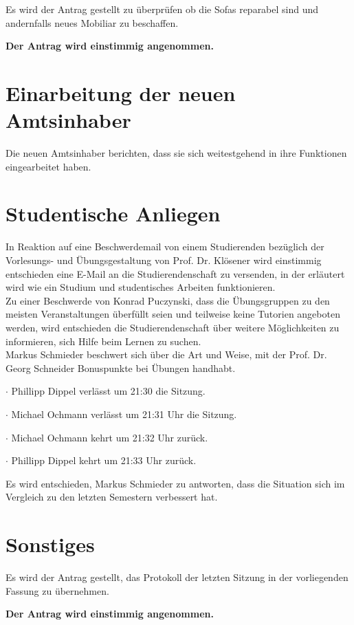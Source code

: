 \documentclass[a4paper, 11pt]{article} %
\begin{document}
Es wird der Antrag gestellt zu überprüfen ob die Sofas reparabel sind und andernfalls neues Mobiliar zu beschaffen.
\begin{center}
	\textbf{Der Antrag wird einstimmig angenommen.}
\end{center}

\section{Einarbeitung der neuen Amtsinhaber}
Die neuen Amtsinhaber berichten, dass sie sich weitestgehend in ihre Funktionen eingearbeitet haben. 

\section{Studentische Anliegen}
In Reaktion auf eine Beschwerdemail von einem Studierenden bezüglich der Vorlesungs- und Übungsgestaltung von Prof. Dr. Klösener wird einstimmig entschieden eine E-Mail an die Studierendenschaft zu versenden, in der erläutert wird wie ein Studium und studentisches Arbeiten funktionieren.
\\
Zu einer Beschwerde von Konrad Puczynski, dass die Übungsgruppen zu den meisten Veranstaltungen überfüllt seien und teilweise keine Tutorien angeboten werden, wird entschieden die Studierendenschaft über weitere Möglichkeiten zu informieren, sich Hilfe beim Lernen zu suchen.
\\
Markus Schmieder beschwert sich über die Art und Weise, mit der Prof. Dr. Georg Schneider Bonuspunkte bei Übungen handhabt.
\begin{flushleft}
\small
	$\cdotp$ Phillipp Dippel verlässt um 21:30 die Sitzung.
\end{flushleft}
\begin{flushleft}
\small
	$\cdotp$ Michael Ochmann verlässt um 21:31 Uhr die Sitzung.
\end{flushleft}
\begin{flushleft}
\small
	$\cdotp$ Michael Ochmann kehrt um 21:32 Uhr zurück.
\end{flushleft}
\begin{flushleft}
\small
	$\cdotp$ Phillipp Dippel kehrt um 21:33 Uhr zurück.
\end{flushleft}
Es wird entschieden, Markus Schmieder zu antworten, dass die Situation sich im Vergleich zu den letzten Semestern verbessert hat.

\section{Sonstiges}
Es wird der Antrag gestellt, das Protokoll der letzten Sitzung in der vorliegenden Fassung zu übernehmen.
\begin{center}
	\textbf{Der Antrag wird einstimmig angenommen.}
\end{center}
\end{document}
